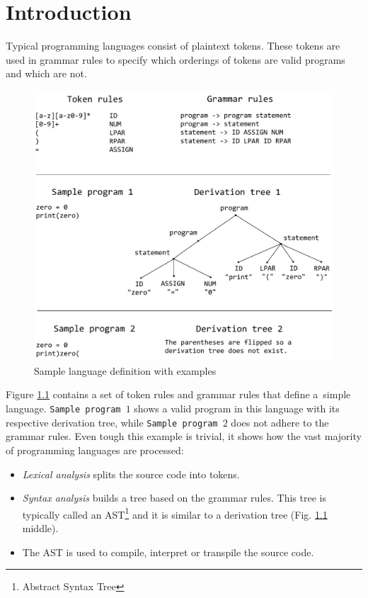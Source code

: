 \chapter{Introduction}

Typical programming languages consist of plaintext tokens. These tokens
are used in grammar rules to specify which orderings of tokens are valid programs and
which are not.
\begin{figure}[!hbt]
	\includegraphics[width=\textwidth]{../img/tokens_and_grammar}
	\caption{Sample language definition with examples}
	\label{fig:chap1:tokens_and_grammar}
\end{figure}

Figure \ref{fig:chap1:tokens_and_grammar} contains a set of token rules and grammar rules that define a~simple
language. \texttt{Sample program $1$} shows a valid program in this language with its respective derivation tree, while
\texttt{Sample program $2$} does not adhere to the grammar rules.
Even tough this example is trivial, it shows how the vast majority of programming languages are processed:
\begin{itemize}
\item \emph{Lexical analysis} splits the source code into tokens.
\item \emph{Syntax analysis} builds a tree based on the grammar rules. This tree is typically called an AST\footnote{Abstract Syntax Tree}
and it is similar to a derivation tree (Fig. \ref{fig:chap1:tokens_and_grammar} middle).
\item The AST is used to compile, interpret or transpile the source code.
\end{itemize}

